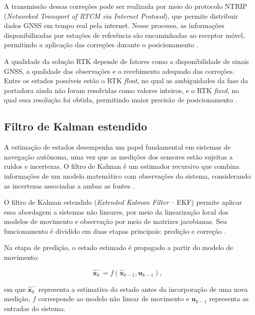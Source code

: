 A transmissão dessas correções pode ser realizada por meio do protocolo NTRIP (\textit{Networked Transport of RTCM via Internet Protocol}), que permite distribuir dados GNSS em tempo real pela internet. Nesse processo, as informações disponibilizadas por estações de referência são encaminhadas ao receptor móvel, permitindo a aplicação das correções durante o posicionamento \citep{BKG2026NTRIP}. 
 
A qualidade da solução RTK depende de fatores como a disponibilidade de sinais GNSS, a qualidade das observações e o recebimento adequado das correções. Entre os estados possíveis estão o RTK \textit{float}, no qual as ambiguidades da fase da portadora ainda não foram resolvidas como valores inteiros, e o RTK \textit{fixed}, no qual essa resolução foi obtida, permitindo maior precisão de posicionamento \citep{Ublox2025ZEDF9R}.

\subsection{Filtro de Kalman estendido}
\label{subsec:fund_ekf}

A estimação de estados desempenha um papel fundamental em sistemas de navegação autônoma, uma vez que as medições dos sensores estão sujeitas a ruídos e incertezas. O filtro de Kalman é um estimador recursivo que combina informações de um modelo matemático com observações do sistema, considerando as incertezas associadas a ambas as fontes \citep{Welch2006}. 

O filtro de Kalman estendido (\textit{Extended Kalman Filter} -- EKF) permite aplicar essa abordagem a sistemas não lineares, por meio da linearização local dos modelos de movimento e observação por meio de matrizes jacobianas. Seu funcionamento é dividido em duas etapas principais: predição e correção \citep{Welch2006,Thrun2006,Thrun2005Robotics}. 

Na etapa de predição, o estado estimado é propagado a partir do modelo de movimento: 

\begin{equation}
    \hat{\mathbf{x}}_{k}^{-} =
    f(\hat{\mathbf{x}}_{k-1},\mathbf{u}_{k-1}),
    \label{eq:ekf_predicao}
\end{equation}

em que $\hat{\mathbf{x}}_{k}^{-}$ representa a estimativa do estado antes da incorporação de uma nova medição, $f$ corresponde ao modelo não linear de movimento e $\mathbf{u}_{k-1}$ representa as entradas do sistema. 

